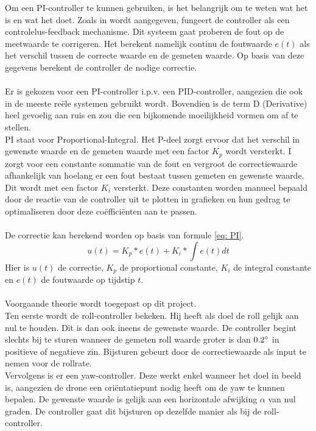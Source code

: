\noindent
Om een PI-controller te kunnen gebruiken, is het belangrijk om te weten wat het is en wat het doet. Zoals in \cite{website:PIDController} wordt aangegeven, fungeert de controller als een controlelus-feedback mechanisme. Dit systeem gaat proberen de fout op de meetwaarde te corrigeren. Het berekent namelijk continu de foutwaarde \(e(t)\) als het verschil tussen de correcte waarde en de gemeten waarde. Op basis van deze gegevens berekent de controller de nodige correctie.
\\
\\
Er is gekozen voor een PI-controller i.p.v. een PID-controller, aangezien die ook in de meeste re\"ele systemen gebruikt wordt. Bovendien is de term D (Derivative) heel gevoelig aan ruis en zou die een bijkomende moeilijkheid vormen om af te stellen.
\\
PI staat voor Proportional-Integral. Het P-deel zorgt ervoor dat het verschil in gewenste waarde en de gemeten waarde met een factor $K_p$ wordt versterkt. 
I zorgt voor een constante sommatie van de fout en vergroot de correctiewaarde afhankelijk van hoelang er een fout bestaat tussen gemeten en gewenste waarde. Dit wordt met een factor $K_i$ versterkt. Deze constanten worden manueel bepaald door de reactie van de controller uit te plotten in grafieken en hun gedrag te optimaliseren door deze co\"effici\"enten aan te passen.
\\
\\
De correctie kan berekend worden op basis van formule \ref{eq: PI}.
\begin{equation} \label{eq: PI}
	u(t) = K_p * e(t) + K_i * \int e(t) dt
\end{equation}
Hier is \(u(t)\) de correctie, $K_p$ de proportional constante, $K_i$ de integral constante en \(e(t)\) de foutwaarde op tijdstip \(t\).
\\
\\
Voorgaande theorie wordt toegepast op dit project.
\\
Ten eerste wordt de roll-controller bekeken. Hij heeft als doel de roll gelijk aan nul te houden. Dit is dan ook ineens de gewenste waarde. De controller begint slechts bij te sturen wanneer de gemeten roll waarde groter is dan \(0.2\degree\) in positieve of negatieve zin. Bijsturen gebeurt door de correctiewaarde als input te nemen voor de rollrate.
\\
Vervolgens is er een yaw-controller. Deze werkt enkel wanneer het doel in beeld is, aangezien de drone een ori\"entatiepunt nodig heeft om de yaw te kunnen bepalen. De gewenste waarde is gelijk aan een horizontale afwijking $\alpha$ van nul graden. De controller gaat dit bijsturen op dezelfde manier als bij de roll-controller.
